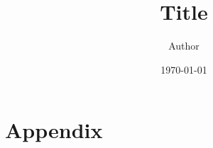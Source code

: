 \documentclass[11pt]{article}
\title{Title}
\author{Author}
\date{\today}
\begin{document}
\begin{titlepage}
  \maketitle
  \thispagestyle{fancy}
  \lhead{

  }
  \rhead{
    \today
  }
  \begin{abstract}

  \end{abstract}
  \cfoot{

  }
\end{titlepage}

\lhead{\theauthor}
\rhead{\thetitle\\\today}
\cfoot{\thepage}



\begin{thebibliography}{9}
\end{thebibliography}

\clearpage
\appendix
\section{Appendix}
\end{document}
